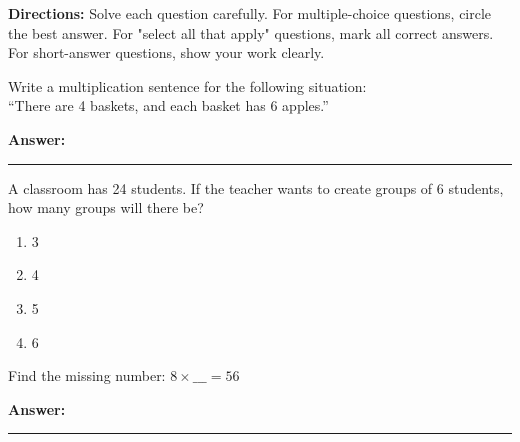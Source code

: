 \documentclass[12pt]{article}
\begin{document}

\begin{tcolorbox}[colframe=black!50, colback=white, title=Assessment Directions]
\textbf{Directions:} Solve each question carefully. For multiple-choice questions, circle the best answer. For "select all that apply" questions, mark all correct answers. For short-answer questions, show your work clearly.
\end{tcolorbox}

\begin{tcolorbox}[colframe=black!50, colback=white, title=\textbf{Problem 1}]
Write a multiplication sentence for the following situation: \\ 
``There are 4 baskets, and each basket has 6 apples.''  

\vspace{1cm}
\textbf{Answer:}  
\vspace{1cm}
\rule{0.2\textwidth}{0.4mm}
\vspace{2cm}
\end{tcolorbox}

\begin{tcolorbox}[colframe=black!50, colback=white, title=\textbf{Problem 2}]
A classroom has 24 students. If the teacher wants to create groups of 6 students, how many groups will there be?  

\begin{enumerate}[label=(\Alph*)]
    \item 3
    \item 4
    \item 5
    \item 6
\end{enumerate}
\end{tcolorbox}

\begin{tcolorbox}[colframe=black!50, colback=white, title=\textbf{Problem 3}]
Find the missing number:  
\(8 \times \_\_\_ = 56\)  

\vspace{1cm}
\textbf{Answer:}  
\vspace{1cm}
\rule{0.7\textwidth}{0.4mm}
\vspace{2cm}
\end{tcolorbox}
\end{document}
